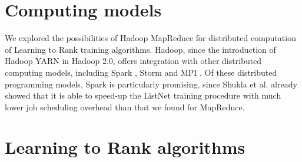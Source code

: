 \section{Computing models}
We explored the possibilities of Hadoop MapReduce for distributed computation of Learning to Rank training algorithms. Hadoop, since the introduction of Hadoop YARN in Hadoop 2.0, offers integration with other distributed computing models, including Spark \cite{}, Storm \cite{} and MPI \cite{}. Of these distributed programming models, Spark is particularly promising, since Shukla et al. \cite{Shukla2012} already showed that it is able to speed-up the ListNet training procedure with much lower job scheduling overhead than that we found for MapReduce. 

\section{Learning to Rank algorithms}
